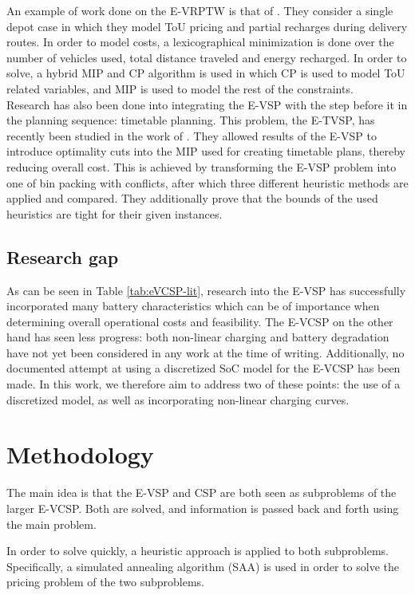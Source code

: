 \documentclass[]{article}
\begin{document}
An example of work done on the E-VRPTW is that of \citet{Ham2021}. They consider a single depot case in which they model ToU pricing and partial recharges during delivery routes. In order to model costs, a lexicographical minimization is done over the number of vehicles used, total distance traveled and energy recharged. In order to solve, a hybrid MIP and CP algorithm is used in which CP is used to model ToU related variables, and MIP is used to model the rest of the constraints. \\

Research has also been done into integrating the E-VSP with the step before it in the planning sequence: timetable planning. This problem, the E-TVSP, has recently been studied in the work of \citet{Stadnichuk2024}. They allowed results of the E-VSP to introduce optimality cuts into the MIP used for creating timetable plans, thereby reducing overall cost. This is achieved by transforming the E-VSP problem into one of bin packing with conflicts, after which three different heuristic methods are applied and compared. They additionally prove that the bounds of the used heuristics are tight for their given instances. 

\subsection{Research gap}
As can be seen in Table \ref{tab:eVCSP-lit}, research into the E-VSP has successfully incorporated many battery characteristics which can be of importance when determining overall operational costs and feasibility. The E-VCSP on the other hand has seen less progress: both non-linear charging and battery degradation have not yet been considered in any work at the time of writing. Additionally, no documented attempt at using a discretized SoC model for the E-VCSP has been made. In this work, we therefore aim to address two of these points: the use of a discretized model, as well as incorporating non-linear charging curves. 

\section{Methodology}
The main idea is that the E-VSP and CSP are both seen as subproblems of the larger E-VCSP. Both are solved, and information is passed back and forth using the main problem. 

In order to solve quickly, a heuristic approach is applied to both subproblems. Specifically, a simulated annealing algorithm (SAA) is used in order to solve the pricing problem of the two subproblems. 
\end{document}
